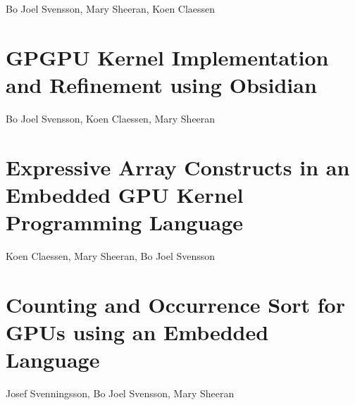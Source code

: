 \documentclass[a4paper]{book}
\newcommand{\paperPAPP}{GPGPU Kernel Implementation and Refinement using Obsidian}
\newcommand{\paperEXPRESSIVE}{Expressive Array Constructs in an Embedded GPU Kernel Programming Language}
\newcommand{\paperCSORT}{Counting and Occurrence Sort for GPUs using an Embedded Language}
\begin{document}
\begin{center} 
Bo Joel Svensson, Mary Sheeran, Koen Claessen
\end{center}



% 
\cleardoublepage 

\section{\paperPAPP}
\label{sec:paperPAPP}

\begin{center} 
Bo Joel Svensson, Koen Claessen, Mary Sheeran
\end{center}




% 
\cleardoublepage 

\section{\paperEXPRESSIVE}
\label{sec:paperEXPRESSIVE}

\begin{center} 
Koen Claessen, Mary Sheeran, Bo Joel Svensson
\end{center}



% 
\cleardoublepage 

\section{\paperCSORT}
\label{sec:paperCSORT}

\begin{center} 
Josef Svenningsson, Bo Joel Svensson, Mary Sheeran 
\end{center}
\end{document}

